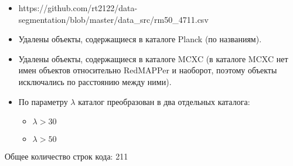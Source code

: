 \documentclass{article}
\begin{document}
\begin{enumerate}
\begin{itemize}
            \item https://github.com/rt2122/data-segmentation/blob/master/data\_src/rm50\_4711.csv \\
            \item Удалены объекты, содержащиеся в каталоге Planck (по названиям). \\
            \item Удалены объекты, содержащиеся в каталоге MCXC (в каталоге MCXC нет имен объектов 
                относительно RedMAPPer и наоборот, поэтому объекты исключались по расстоянию между ними). \\
            \item По параметру $\lambda$ каталог преобразован в два отдельных каталога: \\
                \begin{itemize}
                    \item $\lambda > 30 $\\
                    \item $\lambda > 50 $\\
                \end{itemize}
        \end{itemize}

\end{enumerate}

Общее количество строк кода: 211\\
\end{document}
